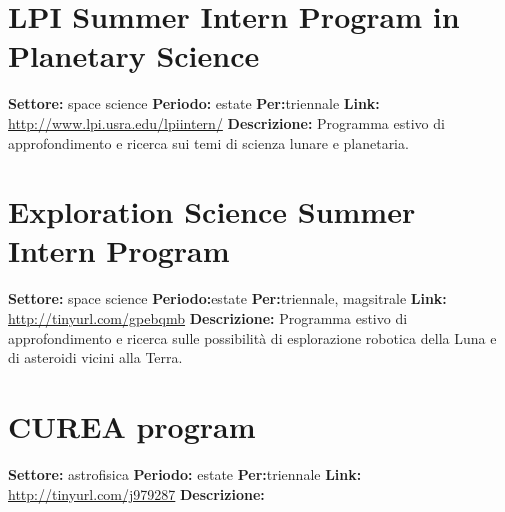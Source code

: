 \documentclass[a4paper,10pt]{article}
\begin{document}
\section{	LPI Summer Intern Program in Planetary Science	}
\textbf{Settore:} space science\newline
\textbf{Periodo:} estate\newline
\textbf{Per:}triennale\newline
\textbf{Link:} \url{http://www.lpi.usra.edu/lpiintern/} \newline
\textbf{Descrizione:}  Programma estivo di approfondimento e ricerca sui temi di scienza lunare e planetaria.	

\section{	Exploration Science Summer Intern Program}
\textbf{Settore:} space science\newline
\textbf{Periodo:}estate \newline
\textbf{Per:}triennale, magsitrale\newline
\textbf{Link:} \url{http://tinyurl.com/gpebqmb} \newline
\textbf{Descrizione:}  	Programma estivo di approfondimento e ricerca sulle possibilità di esplorazione robotica della Luna e di asteroidi vicini alla Terra.	

\section{	CUREA program	}
\textbf{Settore:} astrofisica\newline
\textbf{Periodo:} estate \newline
\textbf{Per:}triennale\newline
\textbf{Link:} \url{http://tinyurl.com/j979287} \newline
\textbf{Descrizione:}  
\end{document}

